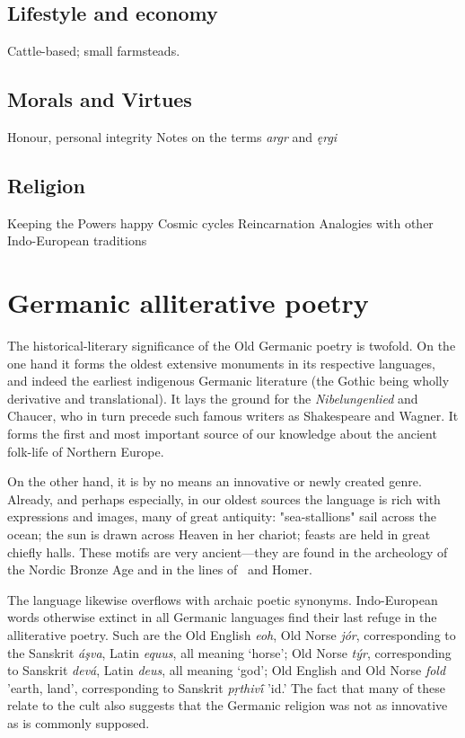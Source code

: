   \subsection{Lifestyle and economy}
    Cattle-based; small farmsteads.
  \subsection{Morals and Virtues}
    Honour, personal integrity
    Notes on the terms \emph{argr} and \emph{ęrgi}
  \subsection{Religion}
    Keeping the Powers happy
    Cosmic cycles
    Reincarnation
    Analogies with other Indo-European traditions


\section{Germanic alliterative poetry}

  The historical-literary significance of the Old Germanic poetry is twofold. On the one hand it forms the oldest extensive monuments in its respective languages, and indeed the earliest indigenous Germanic literature (the Gothic being wholly derivative and translational).  It lays the ground for the \emph{Nibelungenlied} and Chaucer, who in turn precede such famous writers as Shakespeare and Wagner.  It forms the first and most important source of our knowledge about the ancient folk-life of Northern Europe.

  On the other hand, it is by no means an innovative or newly created genre. Already, and perhaps especially, in our oldest sources the language is rich with expressions and images, many of great antiquity: "sea-stallions" sail across the ocean; the sun is drawn across Heaven in her chariot; feasts are held in great chiefly halls. These motifs are very ancient—they are found in the archeology of the Nordic Bronze Age and in the lines of \Rigveda\ and Homer.

  The language likewise overflows with archaic poetic synonyms.  Indo-European words otherwise extinct in all Germanic languages find their last refuge in the alliterative poetry.  Such are the Old English \emph{eoh}, Old Norse \emph{jór}, corresponding to the Sanskrit \emph{áşva}, Latin \emph{equus}, all meaning ‘horse’; Old Norse \emph{týr}, corresponding to Sanskrit \emph{devá}, Latin \emph{deus}, all meaning ‘god’; Old English and Old Norse \emph{fold} 'earth, land', corresponding to Sanskrit \emph{pṛthivī́} 'id.'  The fact that many of these relate to the cult also suggests that the Germanic religion was not as innovative as is commonly supposed.

